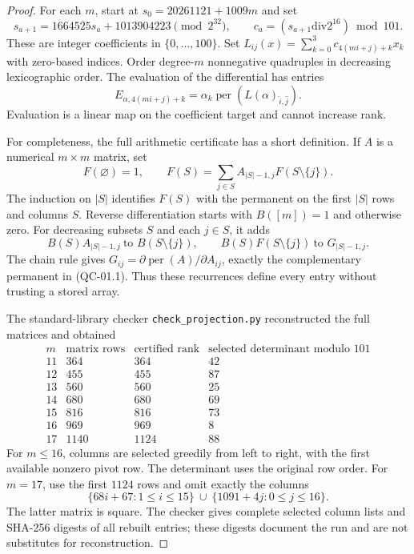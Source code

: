 \begin{proof}
For each $m$, start at $s_0=20261121+1009m$ and set
\[
 s_{a+1}=1664525s_a+1013904223\pmod {2^{32}},\qquad
 c_a=(s_{a+1}\mathbin{\mathrm{div}}2^{16})\bmod101.
\]
These are integer coefficients in $\{0,\ldots,100\}$.
Set $L_{ij}(x)=\sum_{k=0}^3c_{4(mi+j)+k}x_k$ with zero-based
indices. Order degree-$m$ nonnegative quadruples in decreasing
lexicographic order. The evaluation of the differential has entries
\[
 E_{\alpha,4(mi+j)+k}=
 \alpha_k\operatorname{per}(L(\alpha)_{\widehat i,\widehat j}).
 \tag{QC-01.1}
\]
Evaluation is a linear map on the coefficient target and cannot
increase rank.

For completeness, the full arithmetic certificate has a short
definition. If $A$ is a numerical $m\times m$ matrix, set
\[
 F(\varnothing)=1,\qquad
 F(S)=\sum_{j\in S}A_{|S|-1,j}F(S\setminus\{j\}).
 \tag{QC-01.2}
\]
The induction on $|S|$ identifies $F(S)$ with the permanent on
the first $|S|$ rows and columns $S$. Reverse differentiation starts
with $B([m])=1$ and otherwise zero. For decreasing subsets $S$ and
each $j\in S$, it adds
\[
 B(S)A_{|S|-1,j}\ \text{to }B(S\setminus\{j\}),\qquad
 B(S)F(S\setminus\{j\})\ \text{to }G_{|S|-1,j}.
\]
The chain rule gives $G_{ij}=\partial\operatorname{per}(A)/\partial
A_{ij}$, exactly the complementary permanent in (QC-01.1).
Thus these recurrences define every entry without trusting a stored
array.

The standard-library checker \texttt{check\_projection.py}
reconstructed the full matrices and obtained
\[
\begin{array}{c|r|r|r}
 m&\text{matrix rows}&\text{certified rank}&
           \text{selected determinant modulo }101\\\hline
11&364&364&42\\
12&455&455&87\\
13&560&560&25\\
14&680&680&69\\
15&816&816&73\\
16&969&969&8\\
17&1140&1124&88
\end{array}
\]
For $m\leq16$, columns are selected greedily from left to right,
with the first available nonzero pivot row. The determinant uses
the original row order. For $m=17$, use the first $1124$ rows and
omit exactly the columns
\[
 \{68i+67:1\leq i\leq15\}\ \cup\
 \{1091+4j:0\leq j\leq16\}.
\]
The latter matrix is square. The checker gives complete selected
column lists and SHA-256 digests of all rebuilt entries; these
digests document the run and are not substitutes for reconstruction.


\end{proof}
